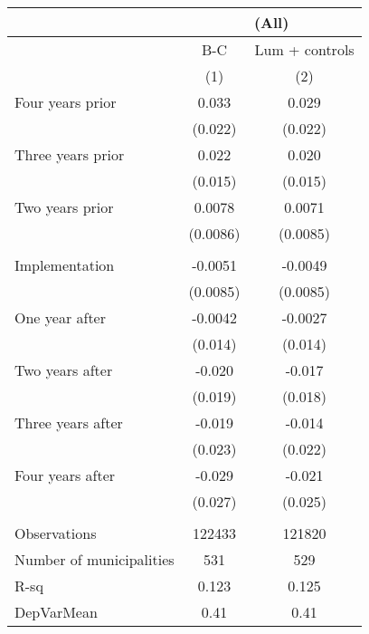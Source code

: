 \begin{tabular}{lcc}
\toprule
      & \multicolumn{2}{c}{(All)} \\
\midrule
      & B-C   & Lum + controls \\
\midrule
      & (1)   & (2) \\
\midrule
\midrule
Four years prior & 0.033 & 0.029 \\
      & (0.022) & (0.022) \\
Three years prior & 0.022 & 0.020 \\
      & (0.015) & (0.015) \\
Two years prior & 0.0078 & 0.0071 \\
      & (0.0086) & (0.0085) \\
      &       &  \\
Implementation & -0.0051 & -0.0049 \\
      & (0.0085) & (0.0085) \\
One year after & -0.0042 & -0.0027 \\
      & (0.014) & (0.014) \\
Two years after & -0.020 & -0.017 \\
      & (0.019) & (0.018) \\
Three years after & -0.019 & -0.014 \\
      & (0.023) & (0.022) \\
Four years after & -0.029 & -0.021 \\
      & (0.027) & (0.025) \\
      &       &  \\
\midrule
Observations & 122433 & 121820 \\
Number of municipalities & 531   & 529 \\
R-sq  & 0.123 & 0.125 \\
DepVarMean & 0.41  & 0.41 \\
\bottomrule
\bottomrule
\end{tabular}%
